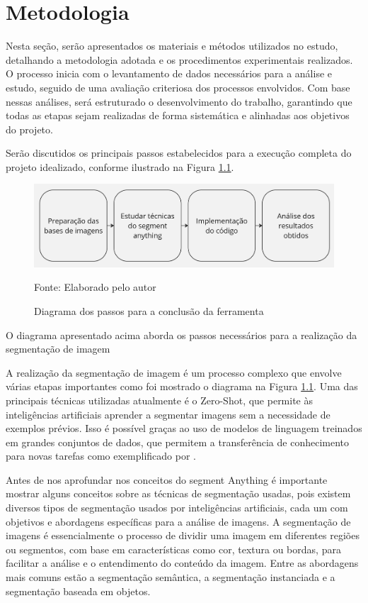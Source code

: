 \chapter{Metodologia}
\label{cap:03}

Nesta seção, serão apresentados os materiais e métodos utilizados no estudo, detalhando a metodologia adotada e os procedimentos experimentais realizados. O processo inicia com o levantamento de dados necessários para a análise e estudo, seguido de uma avaliação criteriosa dos processos envolvidos. Com base nessas análises, será estruturado o desenvolvimento do trabalho, garantindo que todas as etapas sejam realizadas de forma sistemática e alinhadas aos objetivos do projeto.

Serão discutidos os principais passos estabelecidos para a execução completa do projeto idealizado, conforme ilustrado na Figura \ref{fig:desenvolvimento}.

\begin{figure}[ht]
    \caption{Diagrama dos passos para a conclusão da ferramenta}
    \centering
    \includegraphics[scale=0.2]{imagens/progresso_desenvolvimento.jpg}

    Fonte: Elaborado pelo autor
    \label{fig:desenvolvimento}
\end{figure}

O diagrama apresentado acima aborda os passos necessários para a realização da segmentação de imagem

A realização da segmentação de imagem é um processo complexo que envolve várias etapas importantes como foi mostrado o diagrama na Figura \ref{fig:desenvolvimento}. Uma das principais técnicas utilizadas atualmente é o Zero-Shot, que permite às inteligências artificiais aprender a segmentar imagens sem a necessidade de exemplos prévios. Isso é possível graças ao uso de modelos de linguagem treinados em grandes conjuntos de dados, que permitem a transferência de conhecimento para novas tarefas como exemplificado por .

Antes de nos aprofundar nos conceitos do segment Anything é importante mostrar alguns conceitos sobre as técnicas de segmentação usadas, pois existem diversos tipos de segmentação usados por inteligências artificiais, cada um com objetivos e abordagens específicas para a análise de imagens. A segmentação de imagens é essencialmente o processo de dividir uma imagem em diferentes regiões ou segmentos, com base em características como cor, textura ou bordas, para facilitar a análise e o entendimento do conteúdo da imagem. Entre as abordagens mais comuns estão a segmentação semântica, a segmentação instanciada e a segmentação baseada em objetos.

